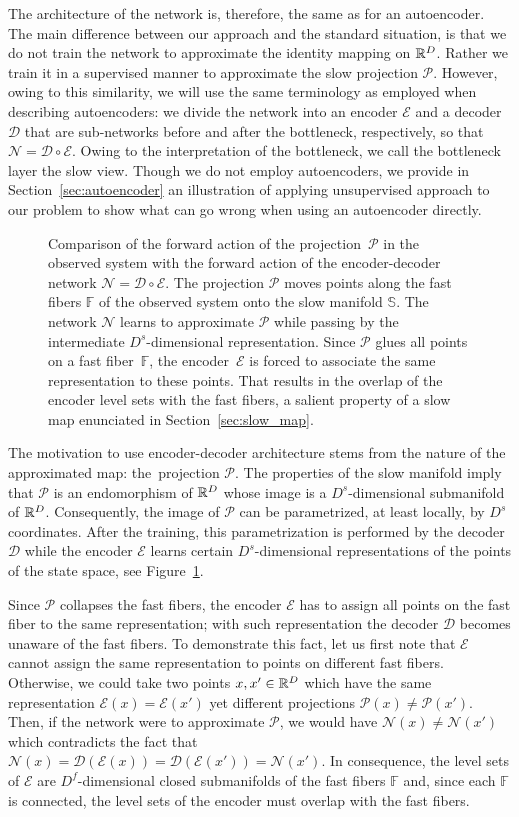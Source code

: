 \documentclass{article}
\newcommand{\enc}{\mathcal{E}} %
\newcommand{\dec}{\mathcal{D}} %
\newcommand{\net}{\mathcal{N}} %
\newcommand{\proj}{\mathcal{P}} %
\newcommand{\ffib}{\mathbb{F}} %
\newcommand{\sman}{\mathbb{S}} %
\begin{document}
The architecture of the network is, therefore, the same as for an autoencoder. The main difference between our approach and the standard situation, is that we do not train the network to approximate the identity mapping on $\mathbb{R}^D$. Rather we train it in a supervised manner to approximate the slow projection $\proj$. However, owing to this similarity, we will use the same terminology as employed when describing autoencoders: we divide the network into an encoder $\enc$ and a decoder $\dec$ that are sub-networks before and after the bottleneck, respectively, so that $\net=\dec\circ\enc$. Owing to the interpretation of the bottleneck, we call the bottleneck layer the slow view. Though we do not employ autoencoders, we provide in Section~\ref{sec:autoencoder} an illustration of applying unsupervised approach to our problem to show what can go wrong when using an autoencoder directly.

\begin{figure}
    \centering
    
    \caption{Comparison of the forward action of the projection~$\proj$ in the observed system with the forward action of the encoder-decoder network $\net=\dec\circ\enc$. The projection $\proj$ moves points along the fast fibers $\ffib$ of the observed system onto the slow manifold $\sman$. The network $\net$ learns to approximate $\proj$ while passing by the intermediate $D^s$-dimensional representation. Since $\proj$ glues all points on a fast fiber~$\ffib$, the encoder~$\enc$ is forced to associate the same representation to these points. That results in the overlap of the encoder level sets with the fast fibers, a salient property of a slow map enunciated in Section~\ref{sec:slow_map}.}
    \label{fig:enc-dec}
\end{figure}

The motivation to use encoder-decoder architecture stems from the nature of the approximated map: the~projection $\proj$. The properties of the slow manifold imply that $\proj$ is an endomorphism of $\mathbb{R}^D$ whose image is a $D^s$-dimensional submanifold of $\mathbb{R}^D$. Consequently, the image of $\proj$ can be parametrized, at least locally, by $D^s$ coordinates. After the training, this parametrization is performed by the decoder $\dec$ while the encoder $\enc$ learns certain $D^s$-dimensional representations of the points of the state space, see Figure~\ref{fig:enc-dec}.

Since $\proj$ collapses the fast fibers, the encoder $\enc$ has to assign all points on the fast fiber to the same representation; with such representation the decoder $\dec$ becomes unaware of the fast fibers. To demonstrate this fact, let us first note that $\enc$ cannot assign the same representation to points on different fast fibers. Otherwise, we could take two points $x,x'\in\mathbb{R}^D$ which have the same representation $\enc(x)=\enc(x')$ yet different projections $\proj(x)\neq\proj(x')$. Then, if the network were to approximate $\proj$, we would have $\net(x)\neq\net(x')$ which contradicts the fact that $\net(x) = \dec(\enc(x)) = \dec(\enc(x'))=\net(x')$. In consequence, the level sets of $\enc$ are $D^f$-dimensional closed submanifolds of the fast fibers $\ffib$ and, since each $\ffib$ is connected, the level sets of the encoder must overlap with the fast fibers.
\end{document}
